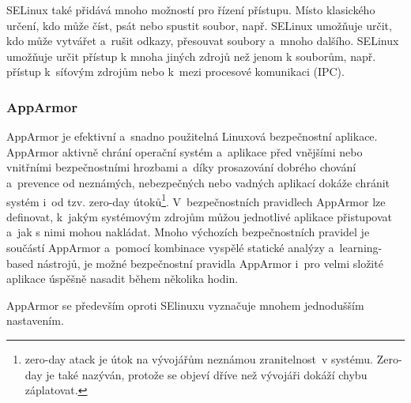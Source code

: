 \documentclass[a4paper,12pt]{article}
\begin{document}
SELinux také přidává mnoho možností pro řízení přístupu. Místo klasického určení, kdo může číst, psát nebo spustit soubor, např. SELinux umožňuje určit, kdo může vytvářet a~rušit odkazy, přesouvat soubory a~mnoho dalšího. SELinux umožňuje určit přístup k mnoha jiných zdrojů než jenom k souborům, např. přístup k~síťovým zdrojům nebo k~mezi procesové komunikaci (IPC).\cite{SElinuxWiki}


\subsubsection{AppArmor}

AppArmor je efektivní a~snadno použitelná Linuxová bezpečnostní aplikace. AppArmor aktivně chrání operační systém a~aplikace před vnějšími nebo vnitřními bezpečnostními hrozbami a~díky prosazování dobrého chování a~prevence od neznámých, nebezpečných nebo vadných aplikací dokáže chránit systém i~od tzv. zero-day útoků\footnote{zero-day atack je útok na vývojářům neznámou zranitelnost~v systému. Zero-day je také nazýván, protože se objeví dříve než vývojáři dokáží chybu záplatovat.}. V~bezpečnostních pravidlech AppArmor lze definovat, k~jakým systémovým zdrojům můžou jednotlivé aplikace přistupovat a~jak s nimi mohou nakládat. Mnoho výchozích bezpečnostních pravidel je součástí AppArmor a~pomocí kombinace vyspělé statické analýzy a~learning-based nástrojů, je možné bezpečnostní pravidla AppArmor i~pro velmi složité aplikace úspěšně nasadit během několika hodin.\cite{AppArmorWikiMain}

AppArmor se především oproti SElinuxu vyznačuje mnohem jednodušším nastavením.
\end{document}
